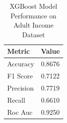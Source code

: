\begin{table}[htbp]
\centering
\caption{XGBoost Model Performance on Adult Income Dataset}
\label{tab:model-performance}
\begin{tabular}{lc}
\toprule
\textbf{Metric} & \textbf{Value} \\
\midrule
Accuracy & 0.8676 \\
F1 Score & 0.7122 \\
Precision & 0.7719 \\
Recall & 0.6610 \\
Roc Auc & 0.9250 \\
\bottomrule
\end{tabular}
\end{table}
